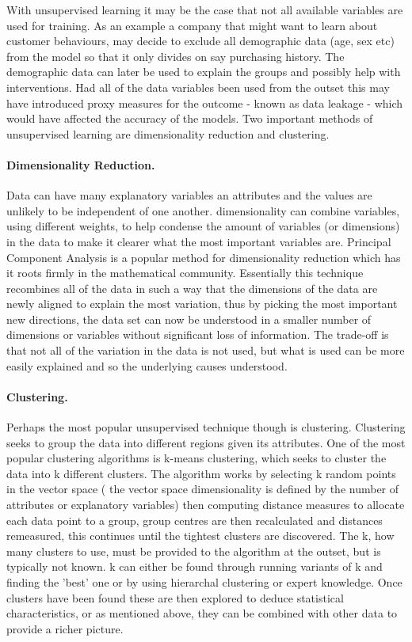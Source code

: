 With unsupervised learning it may be the case that not all available variables are used for training. As an example a company that might want to learn about customer behaviours, may decide to exclude all demographic data (age, sex etc) from the model so that it only divides on say purchasing history. The demographic data can later be used to explain the groups and possibly help with interventions. Had all of the data variables been used from the outset this may have introduced  proxy measures for the outcome - known as data leakage - which would have affected the accuracy of the models. Two important methods of unsupervised learning are dimensionality reduction and clustering.


\paragraph{Dimensionality Reduction.} Data can have many explanatory variables an attributes and the values are unlikely to be independent of  one another. dimensionality can combine variables, using different weights, to help condense the amount of variables (or dimensions) in the data to make it clearer what the most important variables are. Principal Component Analysis is a popular method for dimensionality reduction which has it roots firmly in the mathematical community. Essentially this technique recombines all of the data in such a way that the dimensions of the data are newly aligned to explain the most variation, thus by picking the most important new directions, the data set can now be understood in a smaller number of dimensions or variables without significant loss of information. The trade-off is that not all of the variation in the data is not used, but what is used can be more easily explained and so the underlying causes understood.


\paragraph{Clustering.} Perhaps the most popular unsupervised technique though is clustering. Clustering seeks to group the data into different regions given its attributes. One of the most popular clustering algorithms is k-means clustering, which seeks to cluster the data into k different clusters. The algorithm works by selecting k random points in the vector space ( the vector space dimensionality is defined by the number of attributes or explanatory variables) then computing  distance measures to allocate each data point to a group, group centres are then recalculated and distances remeasured, this continues until the tightest clusters are discovered. The k, how many clusters to use, must be provided to the algorithm at the outset, but is typically not known. k can either be found through running variants of k and finding the 'best' one or by using hierarchal clustering or expert knowledge. Once clusters have been found these are then explored to deduce statistical characteristics, or as mentioned above, they can be combined with other data to provide a richer picture.

